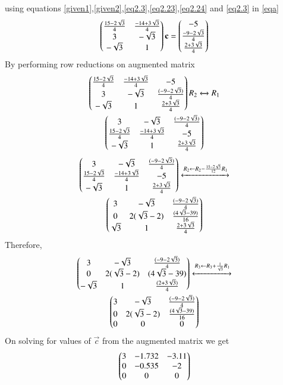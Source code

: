 \documentclass[journal,12pt,twocolumn]{IEEEtran}
\begin{document}
using equations \eqref{given1},\eqref{given2},\eqref{eq2.3},\eqref{eq2.23},\eqref{eq2.24} and \eqref{eq2.3} in \eqref{eqa}
\begin{align}
    \begin{pmatrix}\frac{15-2\sqrt{3}}{4}&\frac{-14+3\sqrt{3}}{4}\\3 & -\sqrt{3}\\ -\sqrt{3}& 1\end{pmatrix}\mathbf{c} =\begin{pmatrix} -5\\\frac{-9-2\sqrt{3}}{4}\\ \frac{2+3\sqrt{3}}{4}\end{pmatrix}\label{eqcen}
\end{align}
By performing row reductions on augmented matrix
\begin{multline}
\begin{pmatrix}\frac{15-2\sqrt{3}}{4}&\frac{-14+3\sqrt{3}}{4}&-5\\3 & -\sqrt{3}&\frac{(-9-2\sqrt{3})}{4}\\ -\sqrt{3}& 1&\frac{2+3\sqrt{3}}{4}\end{pmatrix}{R_2\xleftrightarrow[]{}{R_1}}\\
\begin{pmatrix}3 & -\sqrt{3}&\frac{(-9-2\sqrt{3})}{4}\\\frac{15-2\sqrt{3}}{4}&\frac{-14+3\sqrt{3}}{4}&-5\\-\sqrt{3}& 1&\frac{2+3\sqrt{3}}{4} \end{pmatrix}
\end{multline}
\begin{multline}
\begin{pmatrix}3 & -\sqrt{3}&\frac{(-9-2\sqrt{3})}{4}\\\frac{15-2\sqrt{3}}{4}&\frac{-14+3\sqrt{3}}{4}&-5\\-\sqrt{3}& 1&\frac{2+3\sqrt{3}}{4}\end{pmatrix}
\xleftrightarrow[]{R_2\leftarrow R_2-\frac{15-2\sqrt{3}}{12}R_1}\\
\begin{pmatrix}3 & -\sqrt{3}&\frac{(-9-2\sqrt{3})}{4}\\0 & 2(\sqrt{3}-2) & \frac{(4\sqrt{3}-39)}{16}\\\sqrt{3}& 1&\frac{2+3\sqrt{3}}{4}\end{pmatrix}
\end{multline}
Therefore, 
\begin{multline}
 \begin{pmatrix}3 & -\sqrt{3}&\frac{(-9-2\sqrt{3})}{4}\\0&2(\sqrt{3}-2)&(4\sqrt{3}-39)\\-\sqrt{3}& 1&\frac{(2+3\sqrt{3})}{4}\end{pmatrix}\xleftrightarrow[]{R_3\leftarrow R_3+\frac{1}{\sqrt{3}}R_1}\\
\begin{pmatrix}3 & -\sqrt{3}&\frac{(-9-2\sqrt{3})}{4}\\0 & 2(\sqrt{3}-2) & \frac{(4\sqrt{3}-39)}{16}\\0& 0&0\end{pmatrix}
\end{multline}
On solving for values of $\vec{c}$ from the augmented matrix we get
\begin{multline}
\begin{pmatrix}3 & -1.732&-3.11\\0 & -0.535 & -2\\0& 0&0\end{pmatrix}
\end{multline}
\end{document}

